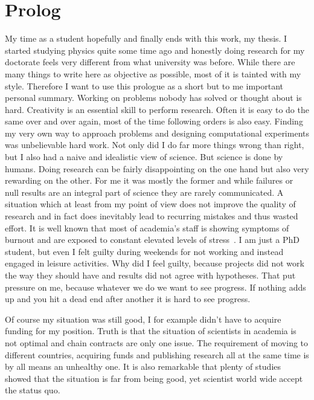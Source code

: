 \section*{Prolog}
\label{sec:prolog}
My time as a student hopefully and finally ends with this work, my thesis.
I started studying physics quite some time ago and honestly doing research for my doctorate feels very different from what university was before.
While there are many things to write here as objective as possible, most of it is tainted with my style.
Therefore I want to use this prologue as a short but to me important personal summary.
Working on problems nobody has solved or thought about is hard.
Creativity is an essential skill to perform research.
Often it is easy to do the same over and over again, most of the time following orders is also easy.
Finding my very own way to approach problems and designing computational experiments was unbelievable hard work. 
Not only did I do far more things wrong than right, but I also had a naive and idealistic view of science.
But science is done by humans.
Doing research can be fairly disappointing on the one hand but also very rewarding on the other.
For me it was mostly the former and while failures or null results are an integral part of science they are rarely communicated.
A situation which at least from my point of view does not improve the quality of research and in fact does inevitably lead to recurring mistakes and thus wasted effort.
It is well known that most of academia's staff is showing symptoms of burnout and are exposed to constant elevated levels of stress~\cite{gewinPandemicBurnoutRampant2021, bilgeExaminingBurnoutAcademics2006, wattsBurnoutUniversityTeaching2011, satinskySystematicReviewMetaanalysis2021}.
I am just a PhD student, but even I felt guilty during weekends for not working and instead engaged in leisure activities.
Why did I feel guilty, because projects did not work the way they should have and results did not agree with hypotheses.
That put pressure on me, because whatever we do we want to see progress.
If nothing adds up and you hit a dead end after another it is hard to see progress.

Of course my situation was still good, I for example didn't have to acquire funding for my position.
Truth is that the situation of scientists in academia is not optimal and chain contracts are only one issue.
The requirement of moving to different countries, acquiring funds and publishing research all at the same time is by all means an unhealthy one.
It is also remarkable that plenty of studies showed that the situation is far from being good, yet scientist world wide accept the status quo.


